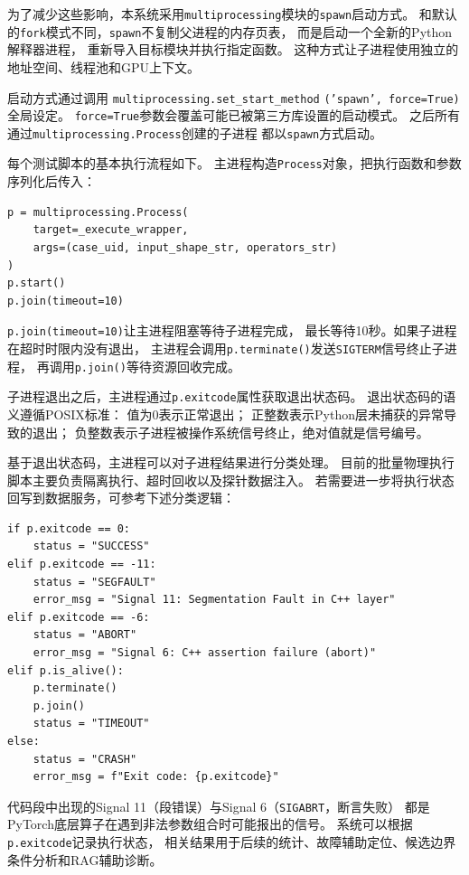 为了减少这些影响，本系统采用\texttt{multiprocessing}模块的\texttt{spawn}启动方式。
和默认的\texttt{fork}模式不同，\texttt{spawn}不复制父进程的内存页表，
而是启动一个全新的Python解释器进程，
重新导入目标模块并执行指定函数。
这种方式让子进程使用独立的地址空间、线程池和GPU上下文。

启动方式通过调用
\texttt{multiprocessing.set\_start\_method}%
\allowbreak\texttt{('spawn', force=True)}全局设定。
\texttt{force=True}参数会覆盖可能已被第三方库设置的启动模式。
之后所有通过\texttt{multiprocessing.Process}创建的子进程
都以\texttt{spawn}方式启动。

每个测试脚本的基本执行流程如下。
主进程构造\texttt{Process}对象，把执行函数和参数序列化后传入：

\begin{verbatim}
p = multiprocessing.Process(
    target=_execute_wrapper,
    args=(case_uid, input_shape_str, operators_str)
)
p.start()
p.join(timeout=10)
\end{verbatim}

\texttt{p.join(timeout=10)}让主进程阻塞等待子进程完成，
最长等待10秒。如果子进程在超时时限内没有退出，
主进程会调用\texttt{p.terminate()}发送\texttt{SIGTERM}信号终止子进程，
再调用\texttt{p.join()}等待资源回收完成。

子进程退出之后，主进程通过\texttt{p.exitcode}属性获取退出状态码。
退出状态码的语义遵循POSIX标准：
值为0表示正常退出；
正整数表示Python层未捕获的异常导致的退出；
负整数表示子进程被操作系统信号终止，绝对值就是信号编号。

基于退出状态码，主进程可以对子进程结果进行分类处理。
目前的批量物理执行脚本主要负责隔离执行、超时回收以及探针数据注入。
若需要进一步将执行状态回写到数据服务，可参考下述分类逻辑：

\begin{verbatim}
if p.exitcode == 0:
    status = "SUCCESS"
elif p.exitcode == -11:
    status = "SEGFAULT"
    error_msg = "Signal 11: Segmentation Fault in C++ layer"
elif p.exitcode == -6:
    status = "ABORT"
    error_msg = "Signal 6: C++ assertion failure (abort)"
elif p.is_alive():
    p.terminate()
    p.join()
    status = "TIMEOUT"
else:
    status = "CRASH"
    error_msg = f"Exit code: {p.exitcode}"
\end{verbatim}

代码段中出现的Signal 11（段错误）与Signal 6（\texttt{SIGABRT}，断言失败）
都是PyTorch底层算子在遇到非法参数组合时可能报出的信号。
系统可以根据\texttt{p.exitcode}记录执行状态，
相关结果用于后续的统计、故障辅助定位、候选边界条件分析和RAG辅助诊断。


